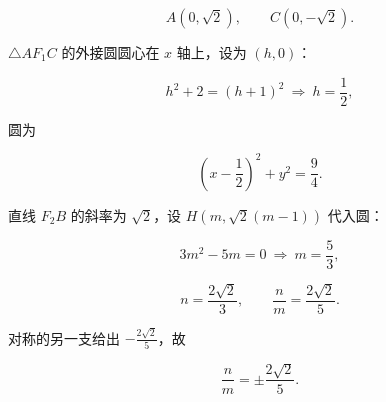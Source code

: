 \begin{answer}
\nopagebreak[4]
\[A(0,\sqrt2),\qquad C(0,-\sqrt2).\]

$\triangle AF_1C$ 的外接圆圆心在 $x$ 轴上，设为 $(h,0)$：

\nopagebreak[4]
\[h^2+2=(h+1)^2\ \Longrightarrow\ h=\frac12,\]

圆为

\nopagebreak[4]
\[\left(x-\frac12\right)^2+y^2=\frac94 .\]

直线 $F_2B$ 的斜率为 $\sqrt2$，设 $H(m,\sqrt2(m-1))$ 代入圆：

\nopagebreak[4]
\[3m^2-5m=0\ \Longrightarrow\ m=\frac53,\]

\nopagebreak[4]
\[n=\frac{2\sqrt2}{3},\qquad \frac nm=\frac{2\sqrt2}{5} .\]

对称的另一支给出 $-\frac{2\sqrt2}{5}$，故

\nopagebreak[4]
\[\frac nm=\pm\frac{2\sqrt2}{5} .\]


\end{answer}
